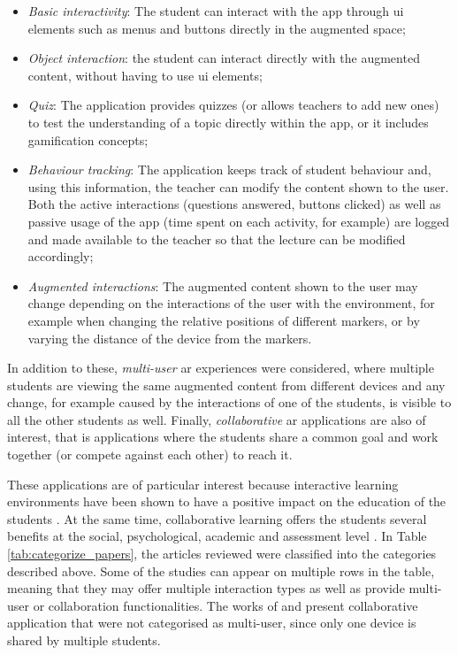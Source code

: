 \begin{itemize}
    \item \emph{Basic interactivity}: The student can interact with the app through \gls{ui} elements such as menus and buttons directly in the augmented space;
    \item \emph{Object interaction}: the student can interact directly with the augmented content, without having to use \gls{ui} elements;
    \item \emph{Quiz}: The application provides quizzes (or allows teachers to add new ones) to test the understanding of a topic directly within the app, or it includes gamification concepts;
    \item \emph{Behaviour tracking}: The application keeps track of student behaviour and, using this information, the teacher can modify the content shown to the user. Both the active interactions (questions answered, buttons clicked) as well as passive usage of the app (time spent on each activity, for example) are logged and made available to the teacher so that the lecture can be modified accordingly;
    \item \emph{Augmented interactions}: The augmented content shown to the user may change depending on the interactions of the user with the environment, for example when changing the relative positions of different markers, or by varying the distance of the device from the markers.
\end{itemize}

In addition to these, \emph{multi-user} \gls{ar} experiences were considered, where multiple students are viewing the same augmented content from different devices and any change, for example caused by the interactions of one of the students, is visible to all the other students as well.
Finally, \emph{collaborative} \gls{ar} applications are also of interest, that is applications where the students share a common goal and work together (or compete against each other) to reach it.

These applications are of particular interest because interactive learning environments have been shown to have a positive impact on the education of the students \citep{johnson2000animated}. At the same time, collaborative learning offers the students several benefits at the social, psychological, academic and assessment level \citep{laal2012benefits}. In Table \ref{tab:categorize_papers}, the \papersSelected articles reviewed were classified into the categories described above. Some of the studies can appear on multiple rows in the table, meaning that they may offer multiple interaction types as well as provide multi-user or collaboration functionalities. The works of \cite{tscholl2016designing} and \cite{ManriqueJuan2017APA} present collaborative application that were not categorised as multi-user, since only one device is shared by multiple students.

